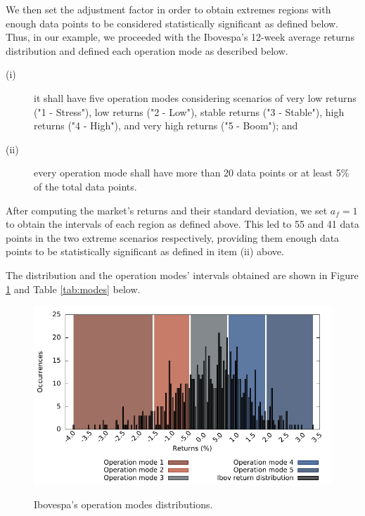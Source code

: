 We then set the adjustment factor in order to obtain extremes regions with enough data points to be considered statistically significant as defined below.
Thus, in our example, we proceeded with the Ibovespa's 12-week average returns distribution and defined each operation mode as described below.
\begin{description}
	\item[(i)] it shall have five operation modes considering scenarios of very low returns ("1 - Stress"), low returns ("2 - Low"), stable returns ("3 - Stable"), high returns ("4 - High"), and very high returns ("5 - Boom"); and
	\item[(ii)] every operation mode shall have more than 20 data points or at least 5\% of the total data points.
\end{description}

After computing the market's returns and their standard deviation, we set $a_f=1$ to obtain the intervals of each region as defined above.
This led to 55 and 41 data points in the two extreme scenarios respectively, providing them enough data points to be statistically significant as defined in item (ii) above.
 
The distribution and the operation modes' intervals obtained are shown in Figure \ref{fig:ibov_dist} and Table \ref{tab:modes} below.
%
\begin{figure} [h!]
	\centering
	\caption{Ibovespa's operation modes distributions.}
	\includegraphics[width=6in,keepaspectratio]{figures/distr}
	\label{fig:ibov_dist}
\end{figure}


